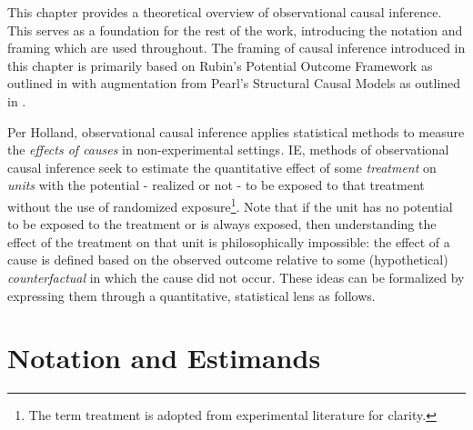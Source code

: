 \documentclass[../main.tex]{subfiles}
\begin{document}

This chapter provides a theoretical overview of observational causal inference. This serves as a foundation for the rest of the work, introducing the notation and framing which are used throughout. The framing of causal inference introduced in this chapter is primarily based on Rubin’s Potential Outcome Framework as outlined in \textcite{Holland1986StatisticsInference} with augmentation from Pearl’s Structural Causal Models as outlined in \textcite{Pearl2009CausalOverview}.\par

\vspace{\baselineskip}
Per Holland, observational causal inference applies statistical methods to measure the \textit{effects of causes} in non-experimental settings\textit{. }IE, methods of observational causal inference seek to estimate the quantitative effect of some \textit{treatment }on \textit{units} with the potential - realized or not - to be exposed to that treatment without the use of randomized exposure\footnote{ The term treatment is adopted from experimental literature for clarity. }. Note that if the unit has no potential to be exposed to the treatment or is always exposed, then understanding the effect of the treatment on that unit is philosophically impossible: the effect of a cause is defined based on the observed outcome relative to some (hypothetical) \textit{counterfactual }in which the cause did not occur. These ideas can be formalized by expressing them through a quantitative, statistical lens as follows.\par

\section{Notation and Estimands}
\end{document}
